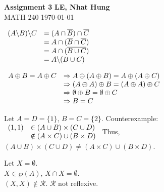 \documentclass[a4paper, 11pt]{article}
\begin{document}
\noindent
\large\textbf{Assignment 3} \hfill \textbf{LE, Nhat Hung} \\
\normalsize MATH 240 \hfill \today

\begin{myEnumerate}
	\item
	\begin{myEnumerate}
    	\item \( \\
        	\begin{array}{llr}
            	(A\backslash B)\backslash C & = (A\cap \overline{B})\cap \overline{C} \\
                & = A\cap(\overline{B}\cap \overline{C}) \\
                & = A\cap(\overline{B\cup C}) \\
                & = A\backslash (B\cup C) \\
            \end{array} \)
        
    	\item \( \\
        	\begin{array}{llr}
            	A\oplus B=A\oplus C & \Rightarrow A\oplus(A\oplus B)=A\oplus(A\oplus C) \\
                & \Rightarrow (A\oplus A)\oplus B=(A\oplus A)\oplus C \\
                & \Rightarrow \emptyset\oplus B=\emptyset \oplus C \\
                & \Rightarrow B=C \\
            \end{array} \)
        
        \item
        	Let $A=D=\{1\}$, $B=C=\{2\}$. Counterexample: \\ \(
            \begin{array}{llr}
            	(1, 1) & \in (A\cup B)\times (C\cup D) \\
                & \notin (A\times C)\cup (B\times D) 
            \end{array} \\\\ \)
            Thus, $(A\cup B)\times (C\cup D)\neq (A\times C)\cup (B\times D)$.
            
    \end{myEnumerate}

	\item
	\begin{myEnumerate}
    	\item
        \begin{myEnumerate}
        	\item
            Let $X=\emptyset$. \\
            $X\in \wp (A)$, $X\cap X=\emptyset$. \\
            $(X,X)\notin \mathcal{R}$. $\mathcal{R}$ not reflexive. \\
            

\end{myEnumerate}
\end{myEnumerate}
\end{myEnumerate}
\end{document}
